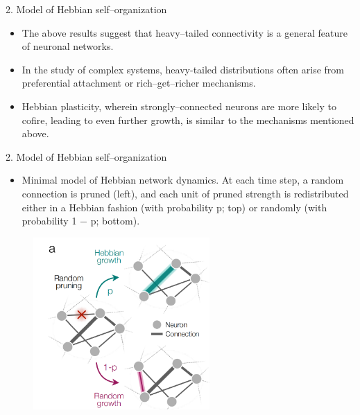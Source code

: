 \documentclass[
  notheorems,
  aspectratio=54,
]{beamer}
\begin{document}
\begin{frame}{2. Model of Hebbian self–organization}
  \begin{itemize}
    \item The above results suggest that heavy–tailed connectivity is a general feature of neuronal networks.
    \item In the study of complex systems, heavy-tailed distributions often arise from preferential attachment or rich–get–richer mechanisms.
    \item Hebbian plasticity, wherein strongly–connected neurons are more likely to cofire, leading to even further growth, is similar to the mechanisms mentioned above.
  \end{itemize}
\end{frame}

\begin{frame}{2. Model of Hebbian self–organization}
  \begin{itemize}
    \item Minimal model of Hebbian
network dynamics. At each time step, a random connection is pruned (left), and each unit of pruned strength
is redistributed either in a Hebbian fashion (with probability p; top) or randomly (with probability 1 −
p; bottom).
  \end{itemize}
  \begin{figure}
    \centering
    \includegraphics[width=0.6\textwidth]{./screenshot/5.png}
  \end{figure}
\end{frame}
\end{document}
